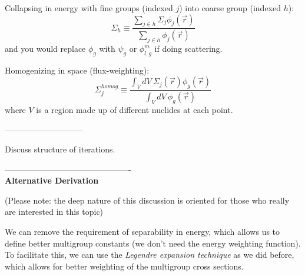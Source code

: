 \documentclass[12pt]{article}
\begin{document}
Collapsing in energy with fine groups (indexed $j$) into coarse group (indexed $h$):
\[
\Sigma_{h} \equiv \frac{\sum_{j \in h} \Sigma_{j} \phi_j(\vec{r})}{\sum_{j\in h} \phi_j(\vec{r})}
\]
and you would replace $\phi_g$ with $\psi_g$ or $\phi_{l,g}^m$ if doing scattering. 

Homogenizing in space (flux-weighting):
\[
\Sigma_j^{homog} \equiv \frac{\int_V dV \: \Sigma_j(\vec{r}) \phi_g(\vec{r})}{\int_V dV \: 
\phi_g(\vec{r})}
\]
where $V$ is a region made up of different nuclides at each point. 

-----------------------------

Discuss structure of iterations.


----------------------------------------------\\
\textbf{Alternative Derivation} 

(Please note: the deep nature of this discussion is oriented for those who really are interested in this topic)

We can remove the requirement of separability in energy, which allows us to define better multigroup constants (we don't need the energy weighting function). \\
To facilitate this, we can use the \textit{Legendre expansion technique} as we did before, which allows for better weighting of the multigroup cross sections.
\end{document}
